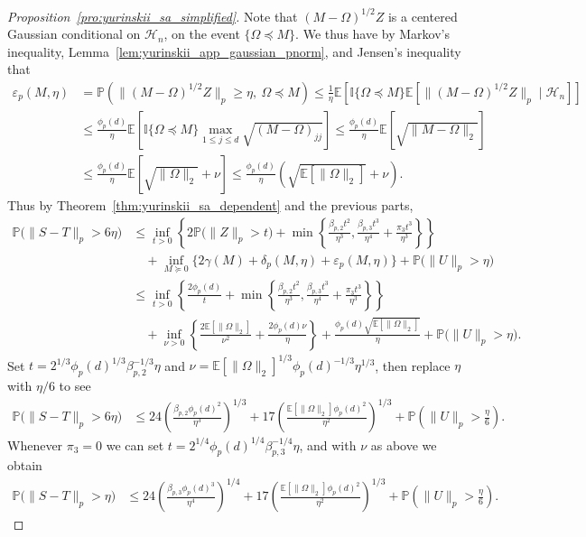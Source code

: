 \documentclass[11pt,lof]{puthesis}
\renewcommand{\P}{\ensuremath{\mathbb{P}}}
\newcommand{\E}{\ensuremath{\mathbb{E}}}
\newcommand{\I}{\ensuremath{\mathbb{I}}}
\newcommand{\cH}{\ensuremath{\mathcal{H}}}
\theoremstyle{break}
\theoremstyle{proof}
\newtheorem{proof}{Proof}
\begin{document}
\begin{proof}[Proposition~\ref{pro:yurinskii_sa_simplified}]
Note that $(M -\Omega)^{1/2}Z$ is a centered Gaussian
conditional on $\cH_n$,
on the event $\{\Omega \preceq M\}$.
We thus have by Markov's inequality,
Lemma~\ref{lem:yurinskii_app_gaussian_pnorm},
and Jensen's inequality that
%
\begin{align*}
\varepsilon_p(M, \eta)
&= \P\left(\big\| (M - \Omega)^{1/2} Z \big\|_p\geq \eta, \
\Omega \preceq M\right)
\leq
\frac{1}{\eta}
\E\left[
\I\{\Omega \preceq M\}
\E\left[
\big\| (M - \Omega)^{1/2} Z \big\|_p
\mid \cH_n
\right]
\right] \\
&\leq
\frac{\phi_p(d)}{\eta}
\E\left[
\I\{\Omega \preceq M\}
\max_{1 \leq j \leq d}
\sqrt{(M - \Omega)_{j j}}
\right]
\leq
\frac{\phi_p(d)}{\eta}
\E\left[
\sqrt{\|M - \Omega\|_2}
\right] \\
&\leq
\frac{\phi_p(d)}{\eta}
\E\left[
\sqrt{\|\Omega\|_2} + \nu
\right]
\leq
\frac{\phi_p(d)}{\eta}
\left(\sqrt{\E[\|\Omega\|_2]} + \nu \right).
\end{align*}
%
Thus by Theorem~\ref{thm:yurinskii_sa_dependent} and the previous parts,
%
\begin{align*}
\P\big(\|S-T\|_p > 6\eta\big)
&\leq
\inf_{t>0}
\left\{
2 \P\big(\|Z\|_p>t\big)
+ \min\left\{
\frac{\beta_{p,2} t^2}{\eta^3},
\frac{\beta_{p,3} t^3}{\eta^4}
+ \frac{\pi_3 t^3}{\eta^3}
\right\}
\right\} \\
&\quad+
\inf_{M \succeq 0}
\big\{ 2\gamma(M) + \delta_p(M,\eta)
+ \varepsilon_p(M, \eta)\big\}
+\P\big(\|U\|_p>\eta\big) \\
&\leq
\inf_{t>0}
\left\{
\frac{2 \phi_p(d)}{t}
+ \min\left\{
\frac{\beta_{p,2} t^2}{\eta^3},
\frac{\beta_{p,3} t^3}{\eta^4}
+ \frac{\pi_3 t^3}{\eta^3}
\right\}
\right\} \\
&\quad+
\inf_{\nu > 0}
\left\{ \frac{2\E \left[ \|\Omega\|_2 \right]}{\nu^2}
+ \frac{2 \phi_p(d) \nu}{\eta}
\right\}
+ \frac{\phi_p(d) \sqrt{\E \left[ \|\Omega\|_2 \right]}}{\eta}
+\P\big(\|U\|_p>\eta\big).
\end{align*}
%
Set $t = 2^{1/3} \phi_p(d)^{1/3} \beta_{p,2}^{-1/3} \eta$
and $\nu = \E[\|\Omega\|_2]^{1/3} \phi_p(d)^{-1/3} \eta^{1/3}$,
then replace $\eta$ with $\eta / 6$ to see
%
\begin{align*}
\P\big(\|S-T\|_p > 6\eta\big)
&\leq
24 \left(
\frac{\beta_{p,2} \phi_p(d)^2}{\eta^3}
\right)^{1/3}
+ 17 \left(
\frac{\E \left[ \|\Omega\|_2 \right] \phi_p(d)^2}{\eta^2}
\right)^{1/3}
+\P\left(\|U\|_p>\frac{\eta}{6}\right).
\end{align*}
%
Whenever $\pi_3 = 0$ we can set
$t = 2^{1/4} \phi_p(d)^{1/4} \beta_{p,3}^{-1/4} \eta$,
and with $\nu$ as above we obtain
%
\begin{align*}
\P\big(\|S-T\|_p > \eta\big)
&\leq
24 \left(
\frac{\beta_{p,3} \phi_p(d)^3}{\eta^4}
\right)^{1/4}
+ 17 \left(
\frac{\E \left[ \|\Omega\|_2 \right] \phi_p(d)^2}{\eta^2}
\right)^{1/3}
+\P\left(\|U\|_p>\frac{\eta}{6}\right).
\end{align*}
%
\end{proof}
\end{document}
